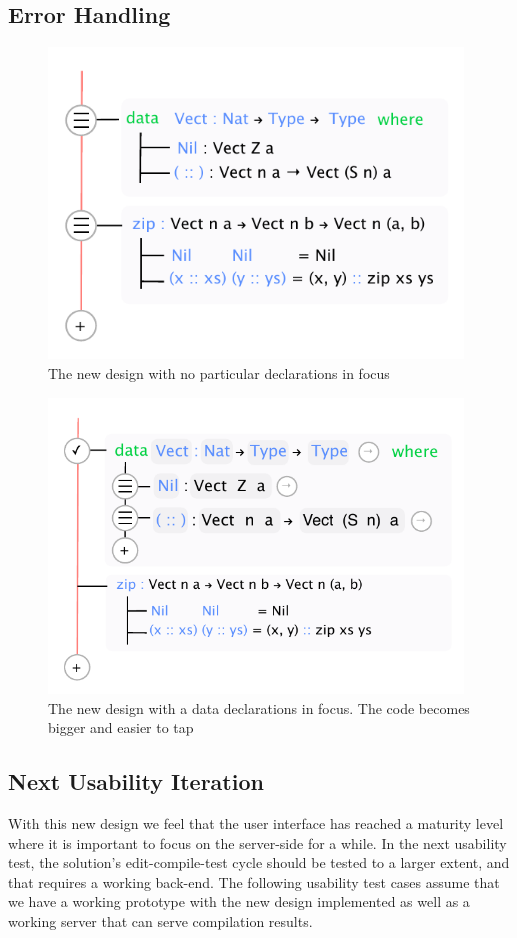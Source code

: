 \subsection{Error Handling}

\begin{figure}
	\centering
		\includegraphics[width=110mm]{diagrams/final_design_nothing_in_focus.pdf}
	\caption{The new design with no particular declarations in focus}
\label{fig:new_design_nothing_in_focus}
\end{figure}

\begin{figure}
	\centering
		\includegraphics[width=110mm]{diagrams/final_design_top_dec_in_focus.pdf}
	\caption{The new design with a data declarations in focus. The code becomes
	bigger and easier to tap}
\label{fig:new_design_data_in_focus}
\end{figure}



\subsection{Next Usability Iteration}
With this new design we feel that the user interface has reached a maturity
level where it is important to focus on the server-side for a while. In the
next usability test, the solution's edit-compile-test cycle should be tested to
a larger extent, and that requires a working back-end. The following usability
test cases assume that we have a working prototype with the new design
implemented as well as a working server that can serve compilation results.


